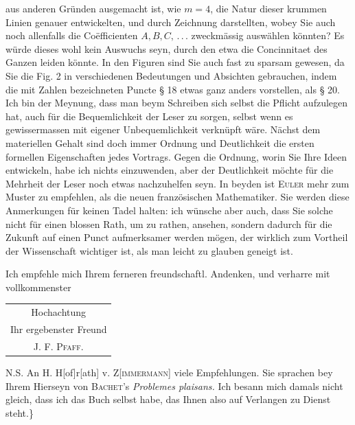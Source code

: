 aus anderen Gründen ausgemacht ist, wie $m=4$, die Natur dieser krummen Linien genauer
entwickelten, und durch Zeichnung darstellten, wobey Sie auch noch allenfalls die Coëfficienten
$A,B,C,\,.\,.\,.$ zweckmässig auswählen könnten? Es würde dieses wohl kein Auswuchs seyn,
durch den etwa die Concinnitaet des Ganzen leiden könnte. In den Figuren sind Sie auch fast zu
sparsam gewesen, da Sie die Fig. 2 in verschiedenen Bedeutungen und Absichten gebrauchen,
indem die mit Zahlen bezeichneten Puncte § 18 etwas ganz anders vorstellen, als § 20.
Ich bin der Meynung, dass man beym Schreiben sich selbst die Pflicht aufzulegen hat, auch für
die Bequemlichkeit der Leser zu sorgen, selbst wenn es gewissermassen mit eigener Unbequemlichkeit
verknüpft wäre. Nächst dem materiellen Gehalt sind doch immer Ordnung und Deutlichkeit die
ersten formellen Eigenschaften jedes Vortrags. Gegen die Ordnung, worin Sie Ihre Ideen
entwickeln, habe ich nichts einzuwenden, aber der Deutlichkeit möchte für die Mehrheit der Leser
noch etwas nachzuhelfen seyn. In beyden ist \textsc{Euler} mehr zum Muster zu empfehlen, als die
neuen französischen Mathematiker. Sie werden diese Anmerkungen für keinen Tadel halten:
ich wünsche aber auch, dass Sie solche nicht für einen blossen Rath, um zu rathen, ansehen,
sondern dadurch für die Zukunft auf einen Punct aufmerksamer werden mögen, der wirklich
zum Vortheil der Wissenschaft wichtiger ist, als man leicht zu glauben geneigt ist.

Ich empfehle mich Ihrem ferneren freundschaftl. Andenken, und verharre mit vollkommenster
\begin{flushright}
\begin{tabular}{c}Hochachtung\\Ihr ergebenster Freund\\J. F. \textsc{Pfaff}.\end{tabular}
\end{flushright}
\noindent\hspace*{\parindent}N.S. An H. H[of]r[ath] v. Z[\textsc{immermann}] viele Empfehlungen.
Sie sprachen bey Ihrem Hierseyn von \textsc{Bachet}’s \textit{Problemes plaisans.}
Ich besann mich damals nicht gleich, dass ich das Buch selbst habe, das Ihnen also auf
Verlangen zu Dienst steht.\}
\ClosingRule
\clearpage
